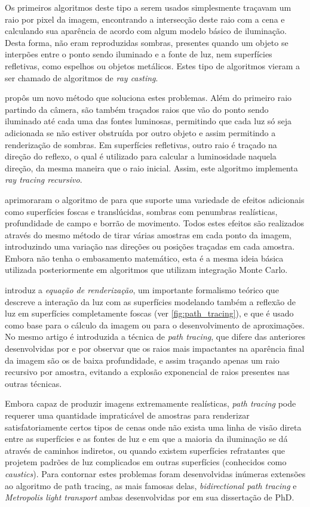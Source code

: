 \documentclass[12pt]{article}
\begin{document}
Os primeiros algoritmos deste tipo a serem usados simplesmente traçavam um raio por pixel da imagem,
encontrando a intersecção deste raio com a cena e calculando sua aparência de acordo com algum
modelo básico de iluminação. Desta forma, não eram reproduzidas sombras, presentes quando um objeto
se interpões entre o ponto sendo iluminado e a fonte de luz, nem superfícies refletivas, como
espelhos ou objetos metálicos. Estes tipo de algoritmos vieram a ser chamado de algoritmos de
\emph{ray casting}.

 propôs um novo método que soluciona estes problemas. Além do primeiro raio
partindo da câmera, são também traçados raios que vão do ponto sendo iluminado até cada uma das
fontes luminosas, permitindo que cada luz só seja adicionada se não estiver obstruída por outro
objeto e assim permitindo a renderização de sombras. Em superfícies refletivas, outro raio é traçado
na direção do reflexo, o qual é utilizado para calcular a luminosidade naquela direção, da mesma
maneira que o raio inicial. Assim, este algoritmo implementa \emph{ray tracing recursivo}.

 aprimoraram o algoritmo de \citeauthor{whitted1980} para que suporte uma variedade
de efeitos adicionais como superfícies foscas e translúcidas, sombras com penumbras realísticas,
profundidade de campo e borrão de movimento. Todos estes efeitos são realizados através do mesmo
método de tirar várias amostras em cada ponto da imagem, introduzindo uma variação nas direções ou
posições traçadas em cada amostra. Embora não tenha o embasamento matemático, esta é a mesma ideia
básica utilizada posteriormente em algoritmos que utilizam integração Monte Carlo.

 introduz a \emph{equação de renderização}, um importante formalismo teórico que
descreve a interação da luz com as superfícies modelando também a reflexão de luz em superfícies
completamente foscas (ver \autoref{fig:path_tracing}), e que é usado como base para o cálculo da
imagem ou para o desenvolvimento de aproximações. No mesmo artigo é introduzida a técnica de
\emph{path tracing}, que difere das anteriores desenvolvidas por \citeauthor{cook1984} e
\citeauthor{whitted1980} por observar que os raios mais impactantes na aparência final da imagem são
os de baixa profundidade, e assim traçando apenas um raio recursivo por amostra, evitando a explosão
exponencial de raios presentes nas outras técnicas.

Embora capaz de produzir imagens extremamente realísticas, \emph{path tracing} pode requerer uma
quantidade impraticável de amostras para renderizar satisfatoriamente certos tipos de cenas onde não
exista uma linha de visão direta entre as superfícies e as fontes de luz e em que a maioria da
iluminação se dá através de caminhos indiretos, ou quando existem superfícies refratantes que
projetem padrões de luz complicados em outras superfícies (conhecidos como \emph{caustics}). Para
contornar estes problemas foram desenvolvidas inúmeras extensões ao algoritmo de path tracing, as
mais famosas delas, \emph{bidirectional path tracing} e \emph{Metropolis light transport} ambas
desenvolvidas por \citeauthor{veach1997} em sua dissertação de PhD\citep{veach1997}.
\end{document}
